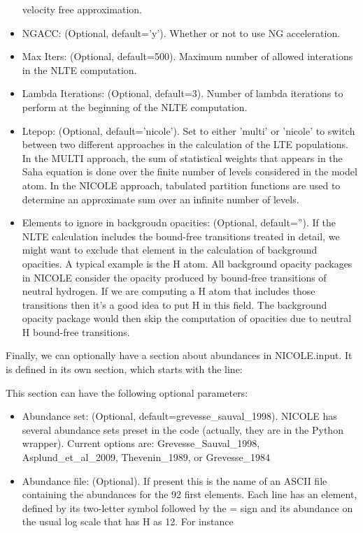 \begin{itemize}
  velocity free approximation.
\item NGACC: (Optional, default='y'). Whether or not to use NG acceleration.
\item Max Iters: (Optional, default=500). Maximum number of allowed
  interations in the NLTE computation. 
\item Lambda Iterations: (Optional, default=3). Number of lambda iterations to perform at the beginning of the NLTE computation.
\item Ltepop: (Optional, default='nicole'). Set to either 'multi' or
  'nicole' to switch between two different approaches in the
  calculation of the LTE populations. In the MULTI approach, the sum
  of statistical weights that appears in the Saha equation is done
  over the finite number of levels considered in the model atom. In
  the NICOLE approach, tabulated partition functions are used to
  determine an approximate sum over an infinite number of levels.
\item Elements to ignore in backgroudn opacities: (Optional,
  default=''). If the NLTE calculation includes the bound-free
  transitions treated in detail, we might want to exclude that element
  in the calculation of background opacities. A typical example is
  the H atom. All background opacity packages in NICOLE consider the
  opacity produced by bound-free transitions of neutral hydrogen. If
  we are computing a H atom that includes those transitions then it's
  a good idea to put H in this field. The background opacity package
  would then skip the computation of opacities due to neutral H
  bound-free transitions.
\end{itemize}

Finally, we can optionally have a section about abundances in
NICOLE.input. It is defined in its own section, which starts with the
line:

\vskip12pt
\leftline{
[Abundances]}
\vskip12pt

This section can have the following optional parameters:
\begin{itemize}
\item Abundance set: (Optional,
  default=grevesse\_sauval\_1998). NICOLE has several abundance sets
  preset in the code (actually, they are in the Python
  wrapper). Current options are: Grevesse\_Sauval\_1998,
  Asplund\_et\_al\_2009, Thevenin\_1989, or Grevesse\_1984
\item Abundance file: (Optional). If present this is the name of an
  ASCII file containing the abundances for the 92 first elements. Each
  line has an element, defined by its two-letter symbol followed by
  the = sign and its abundance on the usual log scale that has H as
  12. For instance

\vskip12pt
\vskip12pt
\end{itemize}

